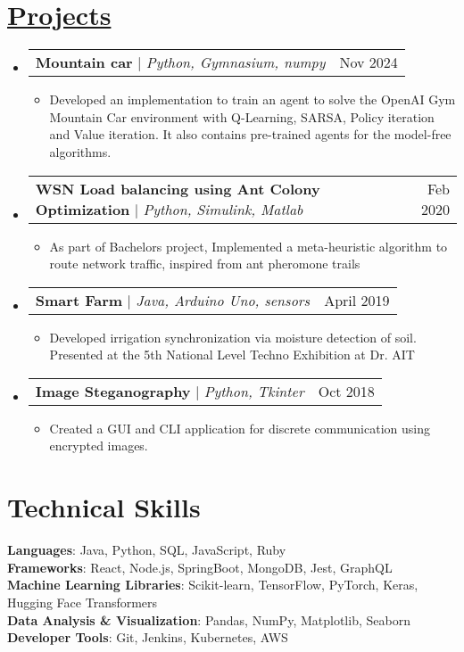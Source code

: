 \documentclass[12pt]{article}
\makeatletter
\newcommand{\resumeItem}[1]{
  \item\small{
    {#1 \vspace{1pt}}
  }
}
\newcommand{\resumeProjectHeading}[2]{
    \item
    \begin{tabular*}{0.97\textwidth}{l@{\extracolsep{\fill}}r}
      \small#1 & #2 \\
    \end{tabular*}\vspace{-8pt}
}
\newcommand{\resumeSubHeadingListStart}{\begin{itemize}[leftmargin=0.15in, label={}]}
\newcommand{\resumeSubHeadingListEnd}{\end{itemize}}
\newcommand{\resumeItemListStart}{\begin{itemize}}
\newcommand{\resumeItemProjListEnd}{\end{itemize}\vspace{-10pt}}
\makeatother
\begin{document}
\section{\href{https://github.com/NshSrnvsn}{Projects}}
    \resumeSubHeadingListStart
    \resumeProjectHeading
          {\textbf{Mountain car} $|$ \emph{Python, Gymnasium, numpy}}{Nov 2024}
          \resumeItemListStart
            \resumeItem{Developed an implementation to train an agent to solve the OpenAI Gym Mountain Car environment with Q-Learning, SARSA, Policy iteration and Value iteration. It also contains pre-trained agents for the model-free algorithms.}
          \resumeItemProjListEnd
      \resumeProjectHeading
          {\textbf{WSN Load balancing using Ant Colony Optimization} $|$ \emph{Python, Simulink, Matlab}}{Feb 2020}
          \resumeItemListStart
            \resumeItem{As part of Bachelors project, Implemented a meta-heuristic algorithm to route network traffic, inspired from ant pheromone trails}
          \resumeItemProjListEnd
      \resumeProjectHeading
          {\textbf{Smart Farm} $|$ \emph{Java, Arduino Uno, sensors}}{April 2019}
          \resumeItemListStart
            \resumeItem{Developed irrigation synchronization via moisture detection of soil. Presented at the 5th National Level Techno Exhibition at Dr. AIT}
          \resumeItemProjListEnd
      \resumeProjectHeading
          {\textbf{Image Steganography} $|$ \emph{Python, Tkinter}}{Oct 2018}
          \resumeItemListStart
            \resumeItem{Created a GUI and CLI application for discrete communication using encrypted images.}
          \resumeItemProjListEnd
    \resumeSubHeadingListEnd



%
\section{Technical Skills}
 \begin{itemize}[leftmargin=0.15in, label={}]
    \small{\item{
     \textbf{Languages}{: Java, Python, SQL, JavaScript, Ruby} \\
     \textbf{Frameworks}{: React, Node.js, SpringBoot, MongoDB, Jest, GraphQL} \\
     \textbf{Machine Learning Libraries}: Scikit-learn, TensorFlow, PyTorch, Keras, Hugging Face Transformers \\
     \textbf{Data Analysis \& Visualization}: Pandas, NumPy, Matplotlib, Seaborn \\
     \textbf{Developer Tools}{: Git, Jenkins, Kubernetes, AWS} 
     
    }}
 \end{itemize}
\end{document}
